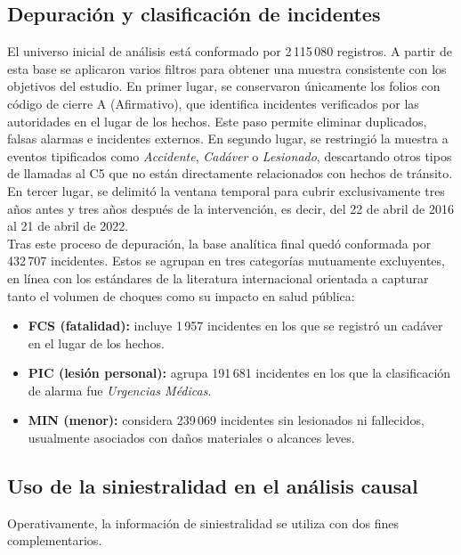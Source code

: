 \subsection{Depuración y clasificación de incidentes}

El universo inicial de análisis está conformado por 2\,115\,080 registros. A partir de esta base se aplicaron varios filtros para obtener una muestra consistente con los objetivos del estudio. En primer lugar, se conservaron únicamente los folios con código de cierre A (Afirmativo), que identifica incidentes verificados por las autoridades en el lugar de los hechos. Este paso permite eliminar duplicados, falsas alarmas e incidentes externos. En segundo lugar, se restringió la muestra a eventos tipificados como \textit{Accidente}, \textit{Cadáver} o \textit{Lesionado}, descartando otros tipos de llamadas al C5 que no están directamente relacionados con hechos de tránsito. En tercer lugar, se delimitó la ventana temporal para cubrir exclusivamente tres años antes y tres años después de la intervención, es decir, del 22 de abril de 2016 al 21 de abril de 2022.\\

Tras este proceso de depuración, la base analítica final quedó conformada por 432\,707 incidentes. Estos se agrupan en tres categorías mutuamente excluyentes, en línea con los estándares de la literatura internacional orientada a capturar tanto el volumen de choques como su impacto en salud pública:

\begin{itemize}
    \item \textbf{FCS (fatalidad):} incluye 1\,957 incidentes en los que se registró un cadáver en el lugar de los hechos.
    \item \textbf{PIC (lesión personal):} agrupa 191\,681 incidentes en los que la clasificación de alarma fue \textit{Urgencias Médicas}.
    \item \textbf{MIN (menor):} considera 239\,069 incidentes sin lesionados ni fallecidos, usualmente asociados con daños materiales o alcances leves.
\end{itemize}

\subsection{Uso de la siniestralidad en el análisis causal}

Operativamente, la información de siniestralidad se utiliza con dos fines complementarios.

